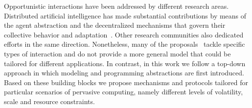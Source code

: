 Opportunistic interactions have been addressed by different research areas. 
Distributed artificial intelligence has made substantial contributions by means of the agent abstraction and the decentralized mechanisms that govern their collective behavior and adaptation~\cite{}. Other research communities also dedicated efforts in the same direction. Nonetheless, many of the proposals~\cite{} tackle specific types of interaction and do not provide a more general model that could be tailored for different applications. In contrast, in this work we follow a top-down approach in which modeling and programming abstractions are first introduced. Based on these building blocks we propose mechanisms and protocols tailored for particular scenarios of pervasive computing, namely different levels of volatility, scale and resource constraints.








